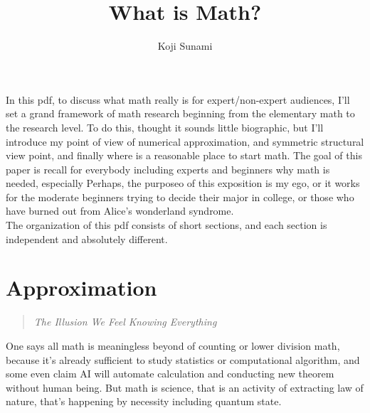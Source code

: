 \documentclass{article}
\title{What is Math?}
\author{Koji Sunami}
\begin{document}
\maketitle

In this pdf, to discuss what math really is for expert/non-expert audiences, I'll set a grand framework of math research
beginning from the elementary math to the research level.
To do this, thought it sounds little biographic, but I'll introduce my point of view of numerical approximation, 
and symmetric structural view point, and finally where is a reasonable place to start math.
The goal of this paper is recall for everybody including experts and beginners why math is needed, especially 
Perhaps, the purposeo of this exposition is my ego, or it works for the moderate beginners trying to decide their major in college,
or those who have burned out from Alice's wonderland syndrome. \\

\noindent
The organization of this pdf consists of short sections, and each section is independent and absolutely different.


\tableofcontents
\vspace{1cm}

\section{Approximation}
\begin{quote}
\textit{The Illusion We Feel Knowing Everything}
\end{quote}

One says all math is meaningless beyond of counting or lower division math, 
because it's already sufficient to study statistics or computational algorithm,
and some even claim AI will automate calculation and conducting new theorem without human being.
But math is science, that is an activity of extracting law of nature, that's happening by necessity including quantum state.
\end{document}
